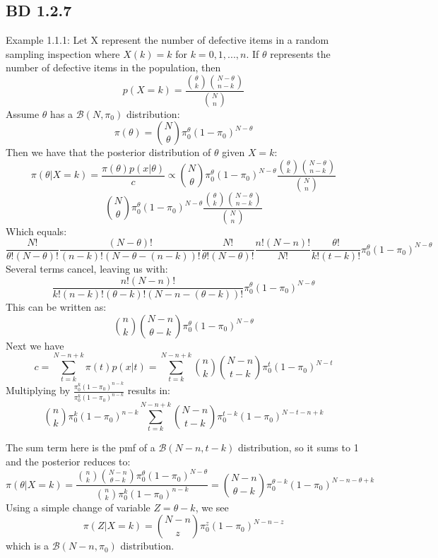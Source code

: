 \documentclass[a4paper,12pt]{article}
\begin{document}
\subsection{BD 1.2.7}
Example 1.1.1: Let X represent the number of defective items in a random sampling inspection where $X(k)=k$ for $k=0,1,...,n$. If $\theta$ represents the number of defective items in the population, then $$p(X=k)=\frac{{\theta\choose k}{N-\theta\choose n-k}}{{N\choose n}}$$ Assume $\theta$ has a $\mathcal{B}(N,\pi_0)$ distribution: $$\pi(\theta)={N\choose\theta}\pi_0^\theta(1-\pi_0)^{N-\theta}$$
Then we have that the posterior distribution of $\theta$ given $X=k$: $$\pi(\theta|X=k)=\frac{\pi(\theta)p(x|\theta)}{c}\propto{N\choose\theta}\pi_0^\theta(1-\pi_0)^{N-\theta}\frac{{\theta\choose k}{N-\theta\choose n-k}}{{N\choose n}}$$
$${N\choose\theta}\pi_0^\theta(1-\pi_0)^{N-\theta}\frac{{\theta\choose k}{N-\theta\choose n-k}}{{N\choose n}}$$
Which equals:$$\frac{N!}{\theta!(N-\theta)!}\frac{(N-\theta)!}{(n-k)!(N-\theta-(n-k))!}\frac{N!}{\theta!(N-\theta)!}\frac{n!(N-n)!}{N!}\frac{\theta!}{k!(t-k)!}\pi_0^{\theta}(1-\pi_0)^{N-\theta}$$
Several terms cancel, leaving us with:
$$\frac{n!(N-n)!}{k!(n-k)!(\theta-k)!(N-n-(\theta-k))!}\pi_0^\theta(1-\pi_0)^{N-\theta}$$
This can be written as:
$${n\choose k}{N-n\choose \theta-k}\pi_0^\theta(1-\pi_0)^{N-\theta}$$
Next we have $$c=\sum_{t=k}^{N-n+k}\pi(t)p(x|t)=\sum_{t=k}^{N-n+k}{n\choose k}{N-n\choose t-k}\pi_0^t(1-\pi_0)^{N-t}$$
Multiplying by $\frac{\pi_0^k(1-\pi_0)^{n-k}}{\pi_0^k(1-\pi_0)^{n-k}}$ results in:$${n\choose k}\pi_0^k(1-\pi_0)^{n-k}\sum_{t=k}^{N-n+k}{N-n\choose t-k}\pi_0^{t-k}(1-\pi_0)^{N-t-n+k}$$

The sum term here is the pmf of a $\mathcal{B}(N-n,t-k)$ distribution, so it sums to 1 and the posterior reduces to: $$\pi(\theta|X=k)=\frac{{n\choose k}{N-n\choose \theta-k}\pi_0^\theta(1-\pi_0)^{N-\theta}}{{n\choose k}\pi_0^k(1-\pi_0)^{n-k}}={N-n\choose \theta-k}\pi_0^{\theta-k}(1-\pi_0)^{N-n-\theta+k}$$
Using a simple change of variable $Z=\theta-k$, we see $$\pi(Z|X=k)={N-n\choose z}\pi_0^{z}(1-\pi_0)^{N-n-z}$$ which is a $\mathcal{B}(N-n,\pi_0)$ distribution.
\end{document}
